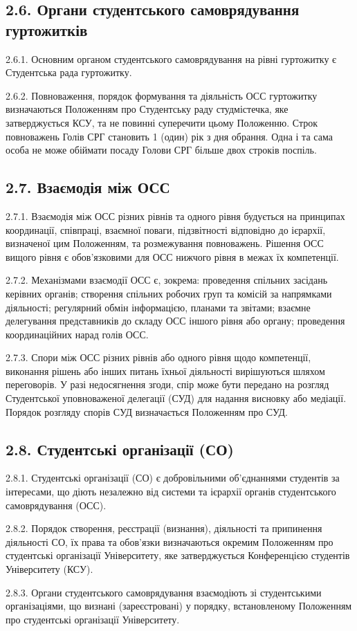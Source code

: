 \subsection*{2.6. Органи студентського самоврядування гуртожитків}
    2.6.1. Основним органом студентського самоврядування на рівні гуртожитку є Студентська рада гуртожитку.

    2.6.2. Повноваження, порядок формування та діяльність ОСС гуртожитку визначаються Положенням про Студентську раду студмістечка, яке затверджується КСУ, та не повинні суперечити цьому Положенню. Строк повноважень Голів СРГ становить 1 (один) рік з дня обрання. Одна і та сама особа не може обіймати посаду Голови СРГ більше двох строків поспіль.

\subsection*{2.7. Взаємодія між ОСС}
    2.7.1. Взаємодія між ОСС різних рівнів та одного рівня будується на принципах координації, співпраці, взаємної поваги, підзвітності відповідно до ієрархії, визначеної цим Положенням, та розмежування повноважень. Рішення ОСС вищого рівня є обов'язковими для ОСС нижчого рівня в межах їх компетенції.

    2.7.2. Механізмами взаємодії ОСС є, зокрема: проведення спільних засідань керівних органів; створення спільних робочих груп та комісій за напрямками діяльності; регулярний обмін інформацією, планами та звітами; взаємне делегування представників до складу ОСС іншого рівня або органу; проведення координаційних нарад голів ОСС.

    2.7.3. Спори між ОСС різних рівнів або одного рівня щодо компетенції, виконання рішень або інших питань їхньої діяльності вирішуються шляхом переговорів. У разі недосягнення згоди, спір може бути передано на розгляд Студентської уповноваженої делегації (СУД) для надання висновку або медіації. Порядок розгляду спорів СУД визначається Положенням про СУД.

\subsection*{2.8. Студентські організації (СО)}
    2.8.1. Студентські організації (СО) є добровільними об'єднаннями студентів за інтересами, що діють незалежно від системи та ієрархії органів студентського самоврядування (ОСС).

    2.8.2. Порядок створення, реєстрації (визнання), діяльності та припинення діяльності СО, їх права та обов'язки визначаються окремим Положенням про студентські організації Університету, яке затверджується Конференцією студентів Університету (КСУ).

    2.8.3. Органи студентського самоврядування взаємодіють зі студентськими організаціями, що визнані (зареєстровані) у порядку, встановленому Положенням про студентські організації Університету.